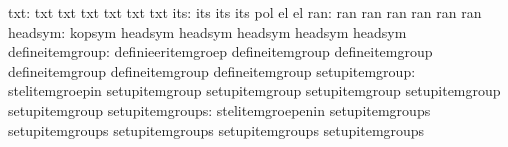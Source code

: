                              txt: txt                              txt
                                  txt                              txt
                                  txt                              txt
                             its: its                              its
                                  its                              pol %
                                  el                               el  %
                             ran: ran                              ran
                                  ran                              ran
                                  ran                              ran
                         headsym: kopsym                           headsym
                                  headsym                          headsym
                                  headsym                          headsym
                 defineitemgroup: definieeritemgroep               defineitemgroup
                                  defineitemgroup                  defineitemgroup
                                  defineitemgroup                  defineitemgroup
                  setupitemgroup: stelitemgroepin                  setupitemgroup
                                  setupitemgroup                   setupitemgroup
                                  setupitemgroup                   setupitemgroup
                 setupitemgroups: stelitemgroepenin                setupitemgroups
                                  setupitemgroups                  setupitemgroups
                                  setupitemgroups                  setupitemgroups



